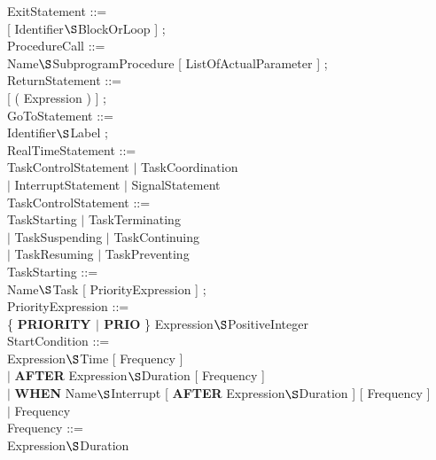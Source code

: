 ExitStatement ::=\\
 [ Identifier$\S $BlockOrLoop ] ;\\

ProcedureCall ::= \\
\x [ {\bf CALL} ] Name$\S $SubprogramProcedure [ ListOfActualParameter ] ;\\

ReturnStatement ::= \\
 [ ( Expression ) ] ;\\

GoToStatement ::= \\
 Identifier$\S $Label ; \\

RealTimeStatement ::=\\
\x TaskControlStatement $\mid$ TaskCoordination\\
\x $\mid$ InterruptStatement $\mid$ SignalStatement\\

TaskControlStatement ::=\\
\x TaskStarting $\mid$ TaskTerminating\\             
\x $\mid$ TaskSuspending $\mid$ TaskContinuing\\   
\x $\mid$ TaskResuming $\mid$ TaskPreventing\\

TaskStarting ::=\\
 Name$\S $Task [ PriorityExpression ] ;\\

PriorityExpression ::=\\
\x \{ {\bf PRIORITY $\mid$ PRIO} \} Expression$\S $PositiveInteger\\

StartCondition ::=\\
 Expression$\S $Time [ Frequency ]\\
\x $\mid$ {\bf AFTER} Expression$\S $Duration [ Frequency ]\\
\x $\mid$ {\bf WHEN} Name$\S $Interrupt [ {\bf AFTER} Expression$\S $Duration ] [ Frequency ] \\
\x $\mid$ Frequency\\

Frequency ::=\\
 Expression$\S $Duration\\
\\


